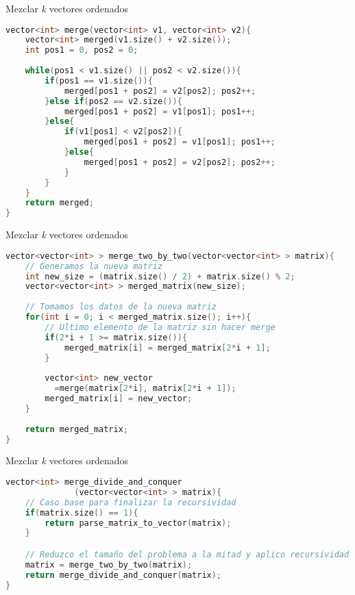 \documentclass[10pt, xcolor=table]{beamer}
\begin{document}
\begin{frame}[fragile]{Mezclar \textit{k} vectores ordenados}
\begin{lstlisting}[language=C]
vector<int> merge(vector<int> v1, vector<int> v2){
	vector<int> merged(v1.size() + v2.size());
	int pos1 = 0, pos2 = 0;
	
	while(pos1 < v1.size() || pos2 < v2.size()){
		if(pos1 == v1.size()){
			merged[pos1 + pos2] = v2[pos2]; pos2++;
		}else if(pos2 == v2.size()){
			merged[pos1 + pos2] = v1[pos1];	pos1++;
		}else{
			if(v1[pos1] < v2[pos2]){
				merged[pos1 + pos2] = v1[pos1]; pos1++;
			}else{
				merged[pos1 + pos2] = v2[pos2]; pos2++;
			}
		}
	}
	return merged;
}

\end{lstlisting}
\end{frame}
\begin{frame}[fragile]{Mezclar \textit{k} vectores ordenados}
\begin{lstlisting}[language=C]
vector<vector<int> > merge_two_by_two(vector<vector<int> > matrix){
	// Generamos la nueva matriz
	int new_size = (matrix.size() / 2) + matrix.size() % 2;
	vector<vector<int> > merged_matrix(new_size);
	
	// Tomamos los datos de la nueva matriz
	for(int i = 0; i < merged_matrix.size(); i++){
		// Ultimo elemento de la matriz sin hacer merge
		if(2*i + 1 >= matrix.size()){
			merged_matrix[i] = merged_matrix[2*i + 1];
		}
	
		vector<int> new_vector
		  =merge(matrix[2*i], matrix[2*i + 1]);
		merged_matrix[i] = new_vector;
	}
	
	return merged_matrix;
}


\end{lstlisting}
\end{frame}

\begin{frame}[fragile]{Mezclar \textit{k} vectores ordenados}
\begin{lstlisting}[language=C]
vector<int> merge_divide_and_conquer
              (vector<vector<int> > matrix){
	// Caso base para finalizar la recursividad
	if(matrix.size() == 1){
		return parse_matrix_to_vector(matrix);
	}

	// Reduzco el tamaño del problema a la mitad y aplico recursividad
	matrix = merge_two_by_two(matrix);
	return merge_divide_and_conquer(matrix);
}

\end{lstlisting}
\end{frame}
\end{document}

